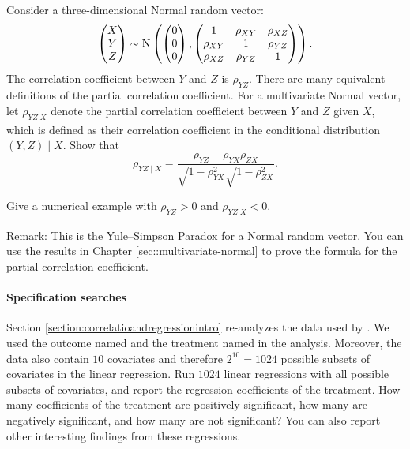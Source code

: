 Consider a three-dimensional Normal random vector:
$$
\begin{pmatrix}
X\\
Y\\
Z
\end{pmatrix}
\sim 
\textsc{N}
\left(
\begin{pmatrix}
0\\
0\\
0
\end{pmatrix},
\begin{pmatrix}
1 & \rho_{XY} &\rho_{XZ} \\
  \rho_{XY}  & 1 & \rho_{YZ} \\
  \rho_{XZ} &  \rho_{YZ} & 1
\end{pmatrix}
\right) . 
$$
The correlation coefficient between $Y$ and $Z$ is $\rho_{YZ}$. 
There are many equivalent definitions of the partial correlation coefficient. 
For a multivariate Normal vector, let $\rho_{YZ|X}$ denote the partial correlation coefficient between $Y$ and $Z$ given $X$, which is defined as their correlation coefficient in the conditional distribution $(Y, Z)\mid X$. Show that
$$
\rho_{YZ\mid X} = \frac{   \rho_{YZ} - \rho_{YX} \rho_{ZX}  }{  \sqrt{  1-\rho_{YX}^2 }  \sqrt{1- \rho_{ZX}^2  }  }  . 
$$

Give a numerical example with $\rho_{YZ} > 0$ and $\rho_{YZ|X} < 0$. 

Remark: This is the Yule--Simpson Paradox for a Normal random vector. 
You can use the results in Chapter \ref{sec::multivariate-normal} to prove the formula for the partial correlation coefficient. 



\paragraph{Specification searches}\label{hw::lalonde-obs-reg}

Section \ref{section:correlatioandregressionintro} re-analyzes the data used by \citet{hainmueller2012entropy}. We used the outcome named  and the treatment named  in the analysis. Moreover, the data also contain $10$ covariates and therefore $2^{10} = 1024$ possible subsets of covariates in the linear regression. Run $1024$ linear regressions with all possible subsets of covariates, and report the regression coefficients of the treatment. How many coefficients of the treatment are positively significant, how many are negatively significant, and how many are not significant? You can also report other interesting findings from these regressions.


